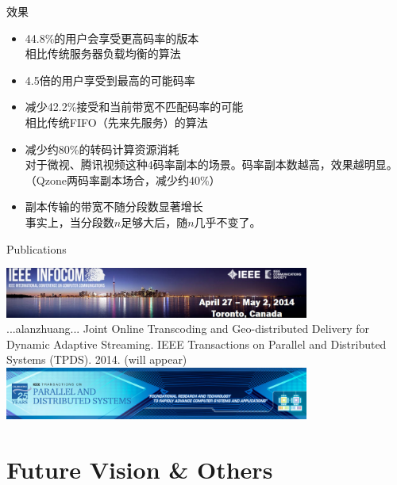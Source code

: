 \documentclass{beamer}
\begin{document}
\begin{frame}{效果}
\begin{itemize}
\item 44.8\%的用户会享受更高码率的版本\\
	相比传统服务器负载均衡的算法
\item 4.5倍的用户享受到最高的可能码率\\
\item 减少42.2\%接受和当前带宽不匹配码率的可能\\
	相比传统FIFO（先来先服务）的算法
\item 减少约80\%的转码计算资源消耗\\
	对于微视、腾讯视频这种4码率副本的场景。码率副本数越高，效果越明显。（Qzone两码率副本场合，减少约40\%）
\item 副本传输的带宽不随分段数显著增长\\
	事实上，当分段数$n$足够大后，随$n$几乎不变了。
\end{itemize}
\end{frame}
\begin{frame}{Publications}
\begin{center}
\includegraphics[width=10cm]{fig/infocom.jpg}\\\pause
...alanzhuang... Joint Online Transcoding and Geo-distributed Delivery for Dynamic Adaptive Streaming. IEEE Transactions on Parallel and Distributed Systems (TPDS). 2014. (will appear)\\\pause
\includegraphics[width=10cm]{fig/tpds_25yr.jpg}\\\pause
\end{center}
\end{frame}

\section{Future Vision \& Others}
\end{document}

